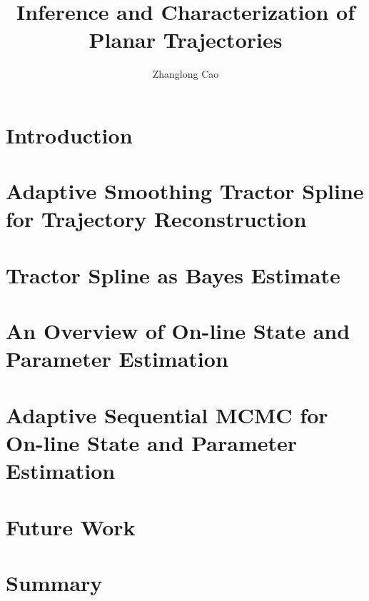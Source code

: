 \documentclass[12pt,twoside]{report}
\title{Inference and Characterization of Planar Trajectories}
\author{Zhanglong Cao}
\date{}
\begin{document}
\frontstuff

\linespread{1.3} \normalsize


\chapter{Introduction}\label{ChapterIntro}

\clearemptydoublepage

\chapter{Adaptive Smoothing Tractor Spline for Trajectory Reconstruction}\label{ChapterTS}

\clearemptydoublepage

\chapter{Tractor Spline as Bayes Estimate}\label{ChapterGPR}

\clearemptydoublepage

\chapter{An Overview of On-line State and Parameter Estimation}\label{ChapterFR}

\clearemptydoublepage

\chapter{Adaptive Sequential MCMC for On-line State and Parameter Estimation}\label{ChapterMCMC}

\clearemptydoublepage

%


\chapter{Future Work}\label{ChapterFuture}

\clearemptydoublepage


\chapter{Summary}\label{ChapterSummary}

\clearemptydoublepage
\end{document}

